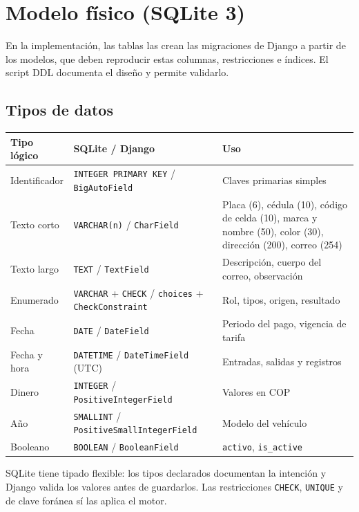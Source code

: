 \section{Modelo físico (SQLite 3)}
En la implementación, las tablas las crean las migraciones de Django a partir de los modelos, que deben reproducir estas columnas, restricciones e índices. El script DDL documenta el diseño y permite validarlo.

\subsection{Tipos de datos}
\begin{longtable}{>{\raggedright\arraybackslash}p{2.8cm}>{\raggedright\arraybackslash}p{5.6cm}>{\raggedright\arraybackslash}p{6cm}}
\toprule
\textbf{Tipo lógico} & \textbf{SQLite / Django} & \textbf{Uso}\\
\midrule\endhead
Identificador & \texttt{INTEGER PRIMARY KEY} / \texttt{BigAutoField} & Claves primarias simples\\
Texto corto & \texttt{VARCHAR(n)} / \texttt{CharField} & Placa (6), cédula (10), código de celda (10), marca y nombre (50), color (30), dirección (200), correo (254)\\
Texto largo & \texttt{TEXT} / \texttt{TextField} & Descripción, cuerpo del correo, observación\\
Enumerado & \texttt{VARCHAR} + \texttt{CHECK} / \texttt{choices} + \texttt{CheckConstraint} & Rol, tipos, origen, resultado\\
Fecha & \texttt{DATE} / \texttt{DateField} & Periodo del pago, vigencia de tarifa\\
Fecha y hora & \texttt{DATETIME} / \texttt{DateTimeField} (UTC) & Entradas, salidas y registros\\
Dinero & \texttt{INTEGER} / \texttt{PositiveIntegerField} & Valores en COP\\
Año & \texttt{SMALLINT} / \texttt{PositiveSmallIntegerField} & Modelo del vehículo\\
Booleano & \texttt{BOOLEAN} / \texttt{BooleanField} & \texttt{activo}, \texttt{is\_active}\\
\bottomrule
\end{longtable}
SQLite tiene tipado flexible: los tipos declarados documentan la intención y Django valida los valores antes de guardarlos. Las restricciones \texttt{CHECK}, \texttt{UNIQUE} y de clave foránea sí las aplica el motor.

